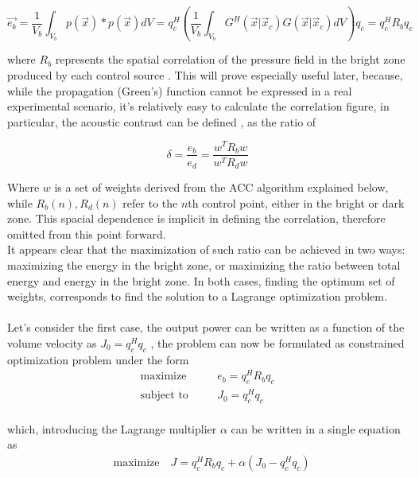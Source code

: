 \begin{equation}
\label{eqn:energycorrelationformulation}
\vec{e_b}=\frac{1}{V_b}\int_{V_b}p(\vec{x}) * p(\vec{x}) dV = q_c^H\left(\frac{1}{V_b}\int_{V_b} \textit{G}^H(\vec{x}|\vec{x}_c)\textit{G}(\vec{x}|\vec{x}_c) dV\right)q_c = q_c^H R_b q_c
\end{equation}

where $R_b$ represents the spatial correlation of the pressure field in the bright zone produced by each control source \parencite{choi_generation_2002}.
This will prove especially useful later, because, while the propagation (Green's) function cannot be expressed in a real experimental scenario, it's relatively easy to calculate the correlation figure, in particular, the acoustic contrast can be defined \parencite{cai_design_2013}, as the ratio of

\begin{equation}
\delta=\frac{e_b}{e_d}=\frac{w^T R_b w}{w^T R_d w}
\label{eqn:contrast}
\end{equation}

Where $w$ is a set of weights derived from the ACC algorithm explained below, while $R_b(n), R_d(n)$ refer to the $n$th control point, either in the bright or dark zone. This spacial dependence is implicit in defining the correlation, therefore omitted from this point forward.
\\
It appears clear that the maximization of such ratio can be achieved in two ways: maximizing the energy in the bright zone, or maximizing the ratio between total energy and energy in the bright zone. In both cases, finding the optimum set of weights, corresponds to find the solution to a Lagrange optimization problem.
\\
\\
Let's consider the first case, the output power can be written as a function of the volume velocity as $J_0=q_c^H q_c$ \parencite{choi_generation_2002}, the problem can now be formulated as constrained optimization problem under the form
\\
\[ \begin{aligned}
&\text{maximize} \quad
&& e_b=q_c^H R_b q_c
&\\
&\text{subject to} \quad 
&& J_0=q_c^H q_c
\end{aligned} \]
\\
which, introducing the Lagrange multiplier $\alpha$ can be written in a single equation as
\[\begin{aligned}
&\text{maximize} \quad J=q_c^H R_b q_c + \alpha(J_0-q_c^Hq_c)
\end{aligned}\]

